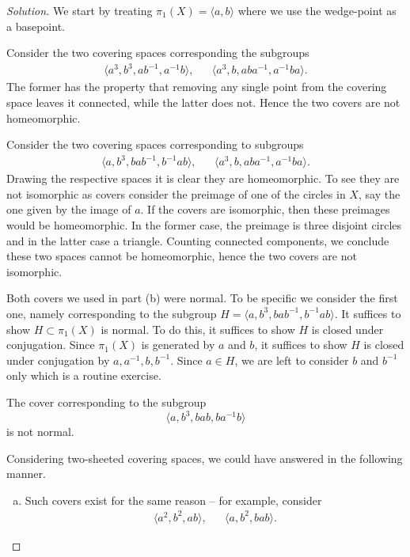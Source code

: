 \begin{proof}[Solution]
  We start by treating $\pi_1(X) = \langle a, b \rangle$ where we use the wedge-point as a basepoint.
  
  Consider the two covering spaces corresponding the subgroups
  \begin{align*}
    \langle a^3, b^3, a b^{-1}, a^{-1} b \rangle, &&
    \langle a^3, b, a b a^{-1}, a^{-1} b a \rangle.
  \end{align*}
  The former has the property that removing any single point from the covering space leaves it connected, while the latter does not. Hence the two covers are not homeomorphic.
  
  Consider the two covering spaces corresponding to subgroups
    \begin{align*}
    \langle a, b^3, b a b^{-1}, b^{-1} a b \rangle, &&
    \langle a^3, b, a b a^{-1}, a^{-1} b a \rangle.
  \end{align*}
  Drawing the respective spaces it is clear they are homeomorphic. To see they are not isomorphic as covers consider the preimage of one of the circles in $X$, say the one given by the image of $a$. If the covers are isomorphic, then these preimages would be homeomorphic. In the former case, the preimage is three disjoint circles and in the latter case a triangle. Counting connected components, we conclude these two spaces cannot be homeomorphic, hence the two covers are not isomorphic.

  Both covers we used in part (b) were normal. To be specific we consider the first one, namely corresponding to the subgroup $H = \langle a, b^3, b a b^{-1}, b^{-1} a b \rangle$. It suffices to show $H \subset \pi_1(X)$ is normal. To do this, it suffices to show $H$ is closed under conjugation. Since $\pi_1(X)$ is generated by $a$ and $b$, it suffices to show $H$ is closed under conjugation by $a, a^{-1}, b, b^{-1}$. Since $a \in H$, we are left to consider $b$ and $b^{-1}$ only which is a routine exercise.

  The cover corresponding to the subgroup
  \[
  \langle a, b^3, b a b, b a^{-1} b \rangle
  \]
  is not normal.

  Considering two-sheeted covering spaces, we could have answered in the following manner.
  \begin{enumerate}[(a)]
  \item
    Such covers exist for the same reason -- for example, consider
    \begin{align*}
      \langle a^2, b^2, a b \rangle, &&
      \langle a, b^2, b a b \rangle.
    \end{align*}
    

\end{enumerate}
\end{proof}
